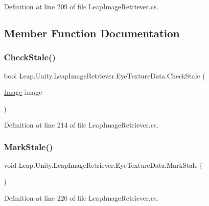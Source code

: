 Definition at line 209 of file Leap\+Image\+Retriever.\+cs.



\subsection{Member Function Documentation}
\mbox{\label{class_leap_1_1_unity_1_1_leap_image_retriever_1_1_eye_texture_data_a06df67c9881e8f29146403560a99c877}} 
\subsubsection{\texorpdfstring{CheckStale()}{CheckStale()}}
{\footnotesize\ttfamily bool Leap.\+Unity.\+Leap\+Image\+Retriever.\+Eye\+Texture\+Data.\+Check\+Stale (\begin{DoxyParamCaption}\item[{\mbox{\hyperlink{class_leap_1_1_image}{Image}}}]{image }\end{DoxyParamCaption})}



Definition at line 214 of file Leap\+Image\+Retriever.\+cs.

\mbox{\label{class_leap_1_1_unity_1_1_leap_image_retriever_1_1_eye_texture_data_a1810624815db23fb176b37c27873d7c6}} 
\subsubsection{\texorpdfstring{MarkStale()}{MarkStale()}}
{\footnotesize\ttfamily void Leap.\+Unity.\+Leap\+Image\+Retriever.\+Eye\+Texture\+Data.\+Mark\+Stale (\begin{DoxyParamCaption}{ }\end{DoxyParamCaption})}



Definition at line 220 of file Leap\+Image\+Retriever.\+cs.

